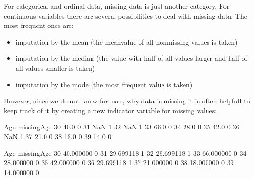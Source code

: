 \documentclass[letterpaper,10pt,english]{jupyterBook}
\begin{document}
\sphinxAtStartPar
For categorical and ordinal data, missing data is just another category.
For continuous variables there are several possibilities to deal with missing data. The most frequent ones are:
\begin{itemize}
\item {} 
\sphinxAtStartPar
imputation by the mean (the mean\sphinxhyphen{}value of all non\sphinxhyphen{}missing values is taken)

\item {} 
\sphinxAtStartPar
imputation by the median (the value with half of all values larger and half of all values smaller is taken)

\item {} 
\sphinxAtStartPar
imputation by the mode (the most frequent value is taken)

\end{itemize}

\sphinxAtStartPar
However, since we do not know for sure, why data is missing it is often helpfull to keep track of it by creating a new indicator variable for missing values:

\sphinxAtStartPar
{}

\begin{sphinxVerbatim}[commandchars=\\\{\}]
     Age  missing\PYGZus{}Age
30  40.0            0
31   NaN            1
32   NaN            1
33  66.0            0
34  28.0            0
35  42.0            0
36   NaN            1
37  21.0            0
38  18.0            0
39  14.0            0
\end{sphinxVerbatim}

\sphinxAtStartPar
{}

\begin{sphinxVerbatim}[commandchars=\\\{\}]
          Age  missing\PYGZus{}Age
30  40.000000            0
31  29.699118            1
32  29.699118            1
33  66.000000            0
34  28.000000            0
35  42.000000            0
36  29.699118            1
37  21.000000            0
38  18.000000            0
39  14.000000            0
\end{sphinxVerbatim}
\end{document}
